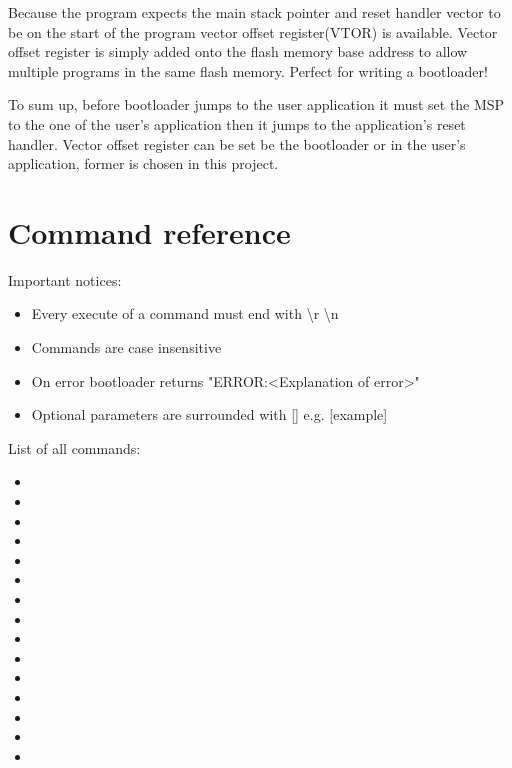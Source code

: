 Because the program expects the main stack pointer and reset handler vector to be on the start of the program vector offset register(VTOR) is available. Vector offset register is simply added onto the flash memory base address to allow multiple programs in the same flash memory. Perfect for writing a bootloader!

To sum up, before bootloader jumps to the user application it must set the MSP to the one of the user's application then it jumps to the application's reset handler. Vector offset register can be set be the bootloader or in the user's application, former is chosen in this project.


\section{Command reference}

Important notices:

\begin{itemize}
 \item Every execute of a command must end with \textbackslash r \textbackslash n

 \item Commands are case insensitive
 
 \item On error bootloader returns "ERROR:<Explanation of error>"
 
 \item Optional parameters are surrounded with [] e.g. [example]

\end{itemize}

\noindent List of all commands:

\begin{itemize}

    \item {}
    \item {}
    \item {}
    \item {}
    \item {}
    \item {}
    \item {}
    \item {}
    \item {}
    \item {} 
    \item {}
    \item {}
    \item {}
    \item {}
    \item {}

\end{itemize}



